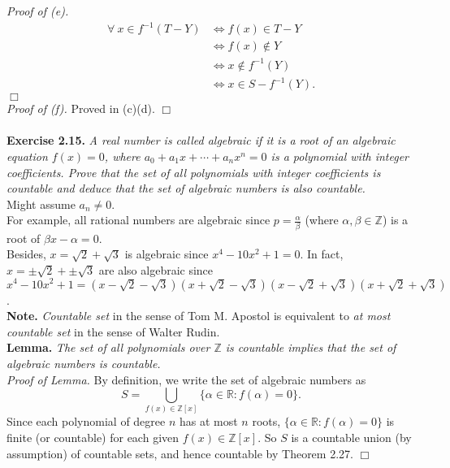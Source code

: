 \documentclass{article}
\begin{document}
\emph{Proof of (e).}
\begin{align*}
  \forall \: x \in f^{-1}(T - Y)
  &\Longleftrightarrow
  f(x) \in T - Y \\
  &\Longleftrightarrow
  f(x) \not\in Y \\
  &\Longleftrightarrow
  x \not\in f^{-1}(Y) \\
  &\Longleftrightarrow
  x \in S - f^{-1}(Y).
\end{align*}
$\Box$ \\

\emph{Proof of (f).}
Proved in (c)(d).
$\Box$ \\\\



\textbf{Exercise 2.15.}
\emph{A real number is called algebraic
if it is a root of an algebraic equation $f(x) = 0$,
where $a_0 + a_1 x + \cdots + a_n x^n = 0$ is a polynomial with integer coefficients.
Prove that the set of all polynomials with integer coefficients is countable
and deduce that the set of algebraic numbers is also countable.} \\

Might assume $a_n \neq 0$. \\

For example, all rational numbers are algebraic
since $p = \frac{\alpha}{\beta}$ (where $\alpha, \beta \in \mathbb{Z}$)
is a root of $\beta x - \alpha = 0$. \\

Besides, $x = \sqrt{2} + \sqrt{3}$ is algebraic since $x^4 - 10x^2 + 1 = 0$.
In fact, $x = \pm\sqrt{2} + \pm\sqrt{3}$ are also algebraic since
$x^4 - 10x^2 + 1 =
(x - \sqrt{2} - \sqrt{3})(x + \sqrt{2} - \sqrt{3})
(x - \sqrt{2} + \sqrt{3})(x + \sqrt{2} + \sqrt{3})$. \\

\textbf{Note.} \emph{Countable set} in the sense of Tom M. Apostol
is equivalent to \emph{at most countable set} in the sense of Walter Rudin. \\

\textbf{Lemma.}
\emph{The set of all polynomials over $\mathbb{Z}$ is countable implies that
the set of algebraic numbers is countable.} \\

\emph{Proof of Lemma.}
By definition, we write the set of algebraic numbers as
$$S = \bigcup_{f(x) \in \mathbb{Z}[x]} \{ \alpha \in \mathbb{R} : f(\alpha) = 0 \}.$$
Since each polynomial of degree $n$ has at most $n$ roots,
$\{ \alpha \in \mathbb{R} : f(\alpha) = 0 \}$ is finite (or countable)
for each given $f(x) \in \mathbb{Z}[x]$.
So $S$ is a countable union (by assumption) of countable sets, and hence countable
by Theorem 2.27.
$\Box$ \\
\end{document}
